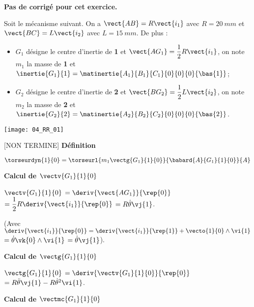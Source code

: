 \normaltrue
\correctionfalse


\setcounter{numques}{0}
\ifcorrection
\else
\textbf{Pas de corrigé pour cet exercice.}
\fi

\ifprof
\else
Soit le mécanisme suivant. On a $\vect{AB}=R\vect{i_1}$ avec $R=\SI{20}{mm}$ et  
$\vect{BC}=L\vect{i_2}$ avec $L=\SI{15}{mm}$. De plus :
\begin{itemize}
\item $G_1$ désigne le centre d'inertie de \textbf{1} et $\vect{AG_1}=\dfrac{1}{2}R\vect{i_1}$, on note $m_1$ la masse de \textbf{1} et $\inertie{G_1}{1}=\matinertie{A_1}{B_1}{C_1}{0}{0}{0}{\bas{1}}$; 
\item $G_2$ désigne le centre d'inertie de \textbf{2} et $\vect{BG_2}=\dfrac{1}{2}L\vect{i_2}$, on note $m_2$ la masse de \textbf{2} et $\inertie{G_2}{2}=\matinertie{A_2}{B_2}{C_2}{0}{0}{0}{\bas{2}}$.
\end{itemize}
\begin{center}
\texttt{[image: 04\_RR\_01]}
\end{center}
\fi

\ifprof

[NON TERMINE]
\textbf{Définition}

$\torseurdyn{1}{0} = \torseurl{m_1 \vectg{G_1}{1}{0}}{\babard{A}{G_1}{1}{0}}{A}$

\textbf{Calcul de $\vectv{G_1}{1}{0}$}

$\vectv{G_1}{1}{0}$ $ = \deriv{\vect{AG_1}}{\rep{0}}$
$ = \dfrac{1}{2}R\deriv{\vect{i_1}}{\rep{0}}$
$ = R\dot{\theta}\vj{1}$.

(Avec $\deriv{\vect{i_1}}{\rep{0}} = \deriv{\vect{i_1}}{\rep{1}} + \vecto{1}{0}\wedge \vi{1}$
$ = \dot{\theta}\vk{0}\wedge \vi{1}$ $ = \dot{\theta}\vj{1}$).

\textbf{Calcul de $\vectg{G_1}{1}{0}$}

$\vectg{G_1}{1}{0}$ $ = \deriv{{\vectv{G_1}{1}{0}}}{\rep{0}}$
$ =  R\ddot{\theta}\vj{1} - R\dot{\theta}^2\vi{1} $.

\textbf{Calcul de $\vectmc{G_1}{1}{0}$}

